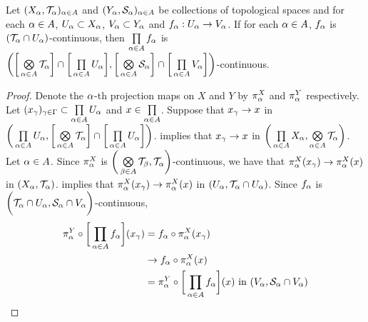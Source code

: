 \documentclass{book}
\begin{document}
	\begin{ex}
		Let $(X_{\alpha}, \mathcal{T}_{\alpha})_{\alpha \in A}$ and $(Y_{\alpha}, \mathcal{S}_{\alpha})_{\alpha \in A}$ be collections of topological spaces and for each $\alpha \in A$, $U_{\alpha} \subset X_{\alpha}$, $V_{\alpha} \subset Y_{\alpha}$ and $f_{\alpha}:U_{\alpha} \rightarrow V_{\alpha}$. If for each $\alpha \in A$, $f_{\alpha}$ is $(\mathcal{T}_{\alpha} \cap U_{\alpha})$-continuous, then $\prod\limits_{\alpha \in A} f_{\alpha}$ is $\bigg( \bigg[ \bigotimes\limits_{\alpha \in A} \mathcal{T}_{\alpha} \bigg] \cap \bigg[ \prod\limits_{\alpha \in A} U_{\alpha} \bigg], \bigg[ \bigotimes\limits_{\alpha \in A} \mathcal{S}_{\alpha} \bigg] \cap \bigg[ \prod\limits_{\alpha \in A} V_{\alpha} \bigg] \bigg)$-continuous.
	\end{ex}
	
	\begin{proof}
		Denote the $\alpha$-th projection maps on $X$ and $Y$ by $\pi^X_{\alpha}$ and $\pi^Y_{\alpha}$ respectively. Let $(x_{\gamma})_{\gamma \in \Gamma} \subset \prod\limits_{\alpha \in A} U_{\alpha}$ and $x \in \prod\limits_{\alpha \in A}$. Suppose that $x_{\gamma} \rightarrow x$ in $\bigg( \prod\limits_{\alpha \in A} U_{\alpha} , \bigg[ \bigotimes\limits_{\alpha \in A} \mathcal{T}_{\alpha} \bigg] \cap \bigg[ \prod\limits_{\alpha \in A} U_{\alpha} \bigg] \bigg)$.  implies that $x_{\gamma} \rightarrow x$ in $\bigg( \prod\limits_{\alpha \in A} X_{\alpha}, \bigotimes\limits_{\alpha \in A} \mathcal{T}_{\alpha}  \bigg)$. Let $\alpha \in A$. Since $\pi^X_{\alpha}$ is $\bigg(\bigotimes\limits_{\beta \in A} \mathcal{T}_{\beta}, \mathcal{T}_{\alpha} \bigg)$-continuous, we have that $\pi^X_{\alpha}(x_{\gamma}) \rightarrow \pi^X_{\alpha}(x)$ in $(X_{\alpha}, \mathcal{T}_{\alpha})$.  implies that $\pi^X_{\alpha}(x_{\gamma}) \rightarrow \pi^X_{\alpha}(x)$ in $(U_{\alpha}, \mathcal{T}_{\alpha} \cap U_{\alpha})$. Since $f_{\alpha}$ is $\bigg(\mathcal{T}_{\alpha} \cap U_{\alpha}, \mathcal{S}_{\alpha} \cap V_{\alpha} \bigg)$-continuous, 
		\begin{align*}
			\pi^Y_{\alpha} \circ \bigg[ \prod\limits_{\alpha \in A}f_{\alpha} \bigg] (x_{\gamma})
			& = f_{\alpha} \circ \pi^X_{\alpha}(x_{\gamma}) \\
			& \rightarrow f_{\alpha} \circ \pi^X_{\alpha}(x) \\
			& = \pi^Y_{\alpha} \circ \bigg[ \prod\limits_{\alpha \in A}f_{\alpha} \bigg] (x)  \text{ in $(V_{\alpha}, \mathcal{S}_{\alpha} \cap V_{\alpha})$} 
		\end{align*}

\end{proof}
\end{document}
